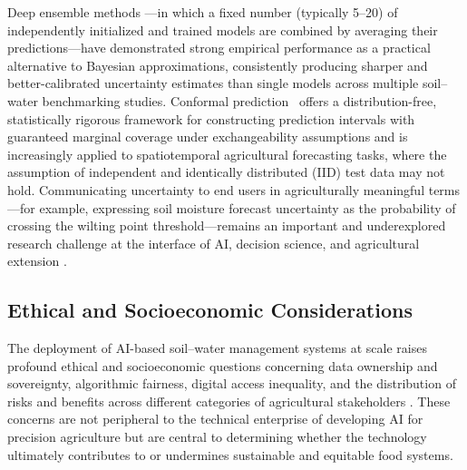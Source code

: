 \documentclass[land,review,accept,pdftex,oneauthor]{Definitions/mdpi}
\begin{document}
Deep ensemble methods \citep{lakshminarayanan2017simple}---in which a fixed number (typically 5--20) of independently initialized and trained models are combined by averaging their predictions---have demonstrated strong empirical performance as a practical alternative to Bayesian approximations, consistently producing sharper and better-calibrated uncertainty estimates than single models across multiple soil--water benchmarking studies. Conformal prediction~\citep{angelopoulos2023conformal} offers a distribution-free, statistically rigorous framework for constructing prediction intervals with guaranteed marginal coverage under exchangeability assumptions and is increasingly applied to spatiotemporal agricultural forecasting tasks, where the assumption of independent and identically distributed (IID) test data may not hold. Communicating uncertainty to end users in agriculturally meaningful terms---for example, expressing soil moisture forecast uncertainty as the probability of crossing the wilting point threshold---remains an important and underexplored research challenge at the interface of AI, decision science, and agricultural extension \citep{moges2021review}.

\subsection{Ethical and Socioeconomic Considerations}

The deployment of AI-based soil--water management systems at scale raises profound ethical and socioeconomic questions concerning data ownership and sovereignty, algorithmic fairness, digital access inequality, and the distribution of risks and benefits across different categories of agricultural stakeholders \citep{janssen2020responsible,shepherd2022ethics}. These concerns are not peripheral to the technical enterprise of developing AI for precision agriculture but are central to determining whether the technology ultimately contributes to or undermines sustainable and equitable food systems.
\end{document}
